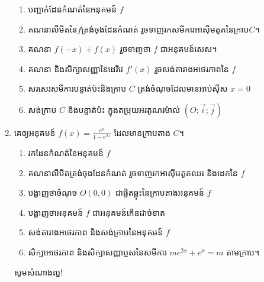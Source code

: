 \documentclass[12pt, a5paper]{article}
\begin{document}
\begin{enumerate}[m]
	\begin{enumerate}[k]
		\item បញ្ជាក់ដែនកំណត់នៃអនុគមន៍ $f$
		\item គណនាលីមីតនៃ$f$ត្រង់ចុងដែនកំណត់ រួចទាញរកសមីការអាស៊ីមតូតនៃក្រាប$C$។
		\item គណនា $f(-x)+f(x)$ រួចទាញថា $f$ ជាអនុគមន៍សេស។
		\item គណនា និងសិក្សាសញ្ញានៃដេរីវេ $f'(x)$ រួចសង់តារាងអថេរភាពនៃ $f$
		\item សរសេរសមីការបន្ទាត់ប៉ះនិងក្រាប $C$ ត្រង់ចំណុចដែលមានអាប់ស៊ីស $x=0$
		\item សង់ក្រាប $C$ និងបន្ទាត់ប៉ះ ក្នុងតម្រុយអរតូណរម៉ាល់ $(O; \vec{i}; \vec{j})$
	\end{enumerate}
	\item គេឲ្យអនុគមន៍ $f(x)=\frac{e^x}{1-e^{2x}}$ ដែលមានក្រាបតាង $C$។
	\begin{enumerate}[k]
		\item រកដែនកំណត់នៃអនុគមន៍ $f$
		\item គណនាលីមីតត្រង់ចុងដែនកំណត់ រួចទាញរកអាស៊ីមតូតឈរ និងដេកនៃ $f$
		\item បង្ហាញថាចំណុច $O(0, 0)$ ជាផ្ចិតឆ្លុះនៃក្រាបតាងអនុគមន៍ $f$
		\item បង្ហាញថាអនុគមន៍ $f$ ជាអនុគមន៍កើនដាច់ខាត
		\item សង់តារាងអថេរភាព និងសង់ក្រាបនៃអនុគមន៍ $f$
		\item សិក្សាអថេរភាព និងសិក្សាសញ្ញាប្ញសនៃសមីការ $me^{2x}+e^x=m$ តាមក្រាប។
	\end{enumerate}
	\begin{center}
		\sffamily\color{black}
		សូមសំណាងល្អ!
	\end{center}
\end{enumerate}
\end{document}
